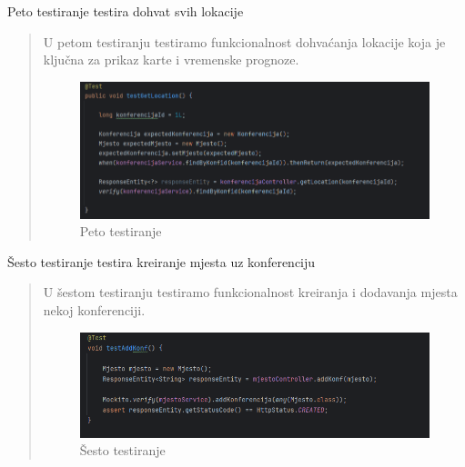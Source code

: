 \begin{packed_enum}
				\item Peto testiranje testira dohvat svih lokacije
				\begin{quote}
					U petom testiranju testiramo funkcionalnost dohvaćanja lokacije koja je ključna za prikaz karte i vremenske prognoze.
					\begin{figure}[H]
						\includegraphics[width=\textwidth]{slike/JUnit5.png} %
						\caption{Peto testiranje}
						\label{fig:JUnit5} %
					\end{figure}
				\end{quote}
				
				\item Šesto testiranje testira kreiranje mjesta uz konferenciju
				\begin{quote}
					U šestom testiranju testiramo funkcionalnost kreiranja i dodavanja mjesta nekoj konferenciji.
					\begin{figure}[H]
						\includegraphics[width=\textwidth]{slike/JUnit6.png} %
						\caption{Šesto testiranje}
						\label{fig:JUnit6} %
					\end{figure}
				\end{quote}
				

\end{packed_enum}
